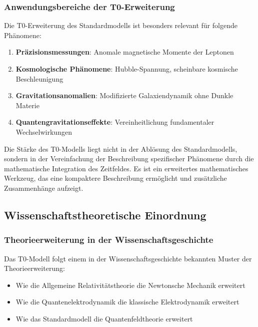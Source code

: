 \documentclass[12pt,a4paper]{article}
\theoremstyle{definition}
\begin{document}
\subsubsection{Anwendungsbereiche der T0-Erweiterung}

Die T0-Erweiterung des Standardmodells ist besonders relevant für folgende Phänomene:

\begin{enumerate}
	\item \textbf{Präzisionsmessungen}: Anomale magnetische Momente der Leptonen
	\item \textbf{Kosmologische Phänomene}: Hubble-Spannung, scheinbare kosmische Beschleunigung
	\item \textbf{Gravitationsanomalien}: Modifizierte Galaxiendynamik ohne Dunkle Materie
	\item \textbf{Quantengravitationseffekte}: Vereinheitlichung fundamentaler Wechselwirkungen
\end{enumerate}

\begin{wichtig}
	Die Stärke des T0-Modells liegt nicht in der Ablösung des Standardmodells, sondern in der Vereinfachung der Beschreibung spezifischer Phänomene durch die mathematische Integration des Zeitfeldes. Es ist ein erweitertes mathematisches Werkzeug, das eine kompaktere Beschreibung ermöglicht und zusätzliche Zusammenhänge aufzeigt.
\end{wichtig}

\subsection{Wissenschaftstheoretische Einordnung}

\subsubsection{Theorieerweiterung in der Wissenschaftsgeschichte}

Das T0-Modell folgt einem in der Wissenschaftsgeschichte bekannten Muster der Theorieerweiterung:

\begin{itemize}
	\item Wie die Allgemeine Relativitätstheorie die Newtonsche Mechanik erweitert
	\item Wie die Quantenelektrodynamik die klassische Elektrodynamik erweitert
	\item Wie das Standardmodell die Quantenfeldtheorie erweitert
\end{itemize}
\end{document}
